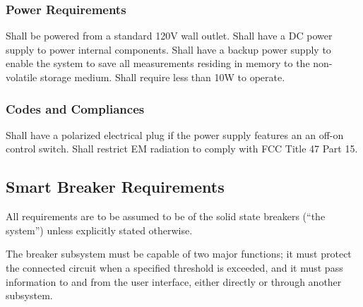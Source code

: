 \subsubsection{Power Requirements}
\begin{outline}[enumerate]
\1 Shall be powered from a standard 120V wall outlet.
\1 Shall have a \ac{DC} power supply to power internal components.
\1 Shall have a backup power supply to enable the system to save all measurements residing in memory to the non-volatile storage medium.
\1 Shall require less than 10W to operate.
\end{outline}

\subsubsection{Codes and Compliances}
\begin{outline}[enumerate]
\1 Shall have a polarized electrical plug if the power supply features an an off-on control switch.
\1 Shall restrict \ac{EM} radiation to comply with \ac{FCC} Title 47 Part 15.
\end{outline}

\subsection{Smart Breaker Requirements}\label{sec:ssb_reqs}
All requirements are to be assumed to be of the solid state breakers (``the system'') unless explicitly stated otherwise.

The breaker subsystem must be capable of two major functions; it must protect the connected circuit when a specified threshold is exceeded, and it must pass information to and from the user interface, either directly or through another subsystem.

